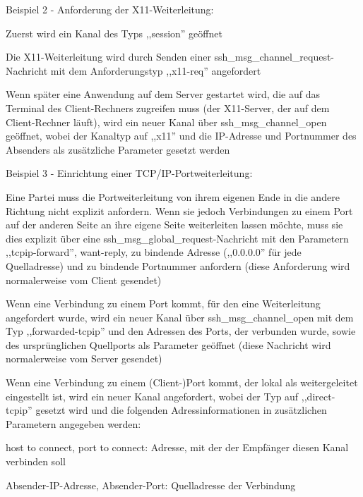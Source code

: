 \documentclass[a4paper]{article}
\begin{document}
\begin{multicols}{3}
\begin{itemize*}
            \begin{itemize*}
                  \item
                  Beispiel 2 - Anforderung der X11-Weiterleitung:

                  \begin{itemize*}
                        \item Zuerst wird ein Kanal des Typs ,,session'' geöffnet
                        \item Die X11-Weiterleitung wird durch Senden einer ssh\_msg\_channel\_request-Nachricht mit dem Anforderungstyp ,,x11-req'' angefordert
                        \item Wenn später eine Anwendung auf dem Server gestartet wird, die auf das Terminal des Client-Rechners zugreifen muss (der X11-Server, der auf dem Client-Rechner läuft), wird ein neuer Kanal über ssh\_msg\_channel\_open geöffnet, wobei der Kanaltyp auf ,,x11'' und die IP-Adresse und Portnummer des Absenders als zusätzliche Parameter gesetzt werden
                  \end{itemize*}
                  \item
                  Beispiel 3 - Einrichtung einer TCP/IP-Portweiterleitung:

                  \begin{itemize*}
                        \item Eine Partei muss die Portweiterleitung von ihrem eigenen Ende in die andere Richtung nicht explizit anfordern. Wenn sie jedoch Verbindungen zu einem Port auf der anderen Seite an ihre eigene Seite weiterleiten lassen möchte, muss sie dies explizit über eine ssh\_msg\_global\_request-Nachricht mit den Parametern ,,tcpip-forward'', want-reply, zu bindende Adresse (,,0.0.0.0'' für jede Quelladresse) und zu bindende Portnummer anfordern (diese Anforderung wird normalerweise vom Client gesendet)
                        \item Wenn eine Verbindung zu einem Port kommt, für den eine Weiterleitung angefordert wurde, wird ein neuer Kanal über ssh\_msg\_channel\_open mit dem Typ ,,forwarded-tcpip'' und den Adressen des Ports, der verbunden wurde, sowie des ursprünglichen Quellports als Parameter geöffnet (diese Nachricht wird normalerweise vom Server gesendet)
                        \item Wenn eine Verbindung zu einem (Client-)Port kommt, der lokal als weitergeleitet eingestellt ist, wird ein neuer Kanal angefordert, wobei der Typ auf ,,direct-tcpip'' gesetzt wird und die folgenden Adressinformationen in zusätzlichen Parametern angegeben werden:
                        \begin{itemize*} \item host to connect, port to connect: Adresse, mit der der Empfänger diesen Kanal verbinden soll \item Absender-IP-Adresse, Absender-Port: Quelladresse der Verbindung \end{itemize*}
                  \end{itemize*}
            \end{itemize*}



\end{itemize*}
\end{multicols}
\end{document}

